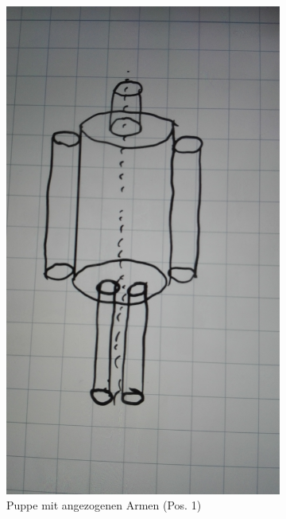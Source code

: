 \begin{figure}[H]
\caption{Positionen der Puppe}
\label{fig:2}
    \begin{subfigure}{0.495\linewidth}
        \centering
        \includegraphics[width=\textwidth]{images/puppe_an.jpg}
        \caption{Puppe mit angezogenen Armen (Pos. 1)}
        \label{fig:2a}
    \end{subfigure}
    \begin{subfigure}{0.495\linewidth}
        \centering

\end{subfigure}
\end{figure}
